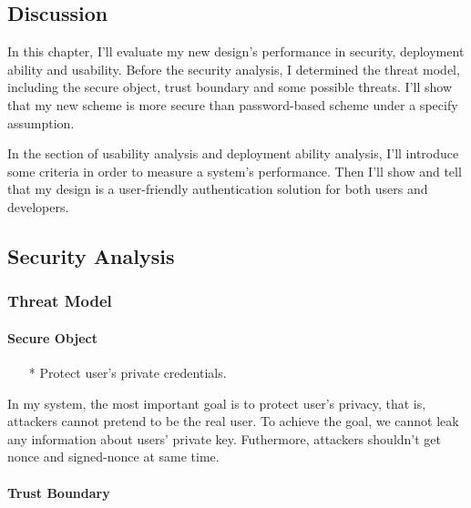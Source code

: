 \begin{CJK}{Bg5}{bsmi}


\chapter{Discussion}

In this chapter, I'll evaluate my new design's performance in security, deployment ability and usability. Before the security analysis, I determined the threat model\cite{threat-model}, including the secure object, trust boundary and some possible threats. I'll show that my new scheme is more secure than password-based scheme under a specify assumption.

In the section of usability analysis and deployment ability analysis, I'll introduce some criteria in order to measure a system's performance. Then I'll show and tell that my design is a user-friendly authentication solution for both users and developers.

\section{Security Analysis}

\subsection{Threat Model}

\subsubsection{Secure Object}

\begin{enumerate}
\item[*] Protect user's private credentials.
\end{enumerate}

In my system, the most important goal is to protect user's privacy, that is, attackers cannot pretend to be the real user. To achieve the goal, we cannot leak any information about users' private key. Futhermore, attackers shouldn't get nonce and signed-nonce at same time.

\subsubsection{Trust Boundary}


\end{CJK}
